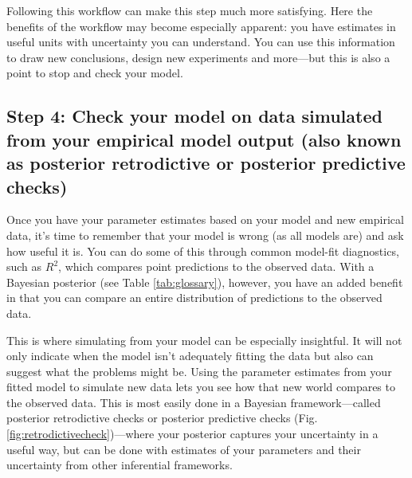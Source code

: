 \documentclass[11pt]{article}
\begin{document}
Following this workflow can make this step much more satisfying. Here the benefits of the workflow may become especially apparent: you have estimates in useful units with uncertainty you can understand. You can use this information to draw new conclusions, design new experiments and more---but this is also a point to stop and check your model. 

\subsection*{Step 4: Check your model on data simulated from your empirical model output (also known as posterior retrodictive or posterior predictive checks)} 

Once you have your parameter estimates based on your model and new empirical data, it's time to remember that your model is wrong (as all models are) and ask how useful it is. You can do some of this through common model-fit diagnostics, such as $R^2$, which compares point predictions to the observed data. With a Bayesian posterior (see Table \ref{tab:glossary}), however, you have an added benefit in that you can compare an entire distribution of predictions to the observed data. 

This is where simulating from your model can be especially insightful. It will not only indicate when the model isn't adequately fitting the data but also can suggest what the problems might be. Using the parameter estimates from your fitted model to simulate new data \citep[][]{held2010,gelman200ppc,conn2018} lets you see how that new world compares to the observed data. This is most easily done in a Bayesian framework---called posterior retrodictive checks or posterior predictive checks (Fig. \ref{fig:retrodictivecheck})---where your posterior captures your uncertainty in a useful way, but can be done with estimates of your parameters and their uncertainty from other inferential frameworks. 
\end{document}
